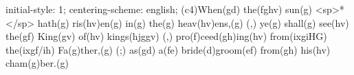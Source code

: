initial-style: 1;
centering-scheme: english;
(c4)When(gd) the(fghv) sun(g) <sp>*</sp> hath(g) ris(hv)en(g) in(g) the(g) heav(hv)ens,(g) (,) ye(g) shall(g) see(hv) the(gf) King(gv) of(hv) kings(hjggv) (,) pro(f)ceed(gh)ing(hv) from(ixgiHG) the(ixgf/ih) Fa(g)ther,(g) (;) as(gd) a(fe) bride(d)groom(ef) from(gh) his(hv) cham(g)ber.(g)

